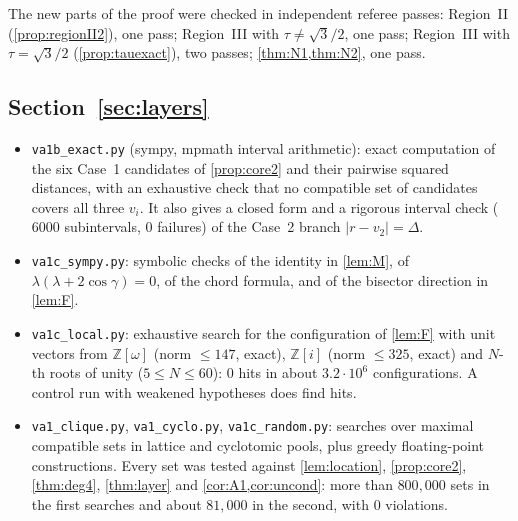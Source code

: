 \documentclass[11pt]{amsart}
\theoremstyle{definition}
\theoremstyle{remark}
\begin{document}
The new parts of the proof were checked in independent referee passes: Region~II (\cref{prop:regionII2}), one pass; Region~III with $\tau\ne\sqrt3/2$, one pass; Region~III with $\tau=\sqrt3/2$ (\cref{prop:tauexact}), two passes; \cref{thm:N1,thm:N2}, one pass.

\subsection*{\texorpdfstring{Section~\ref{sec:layers}}{Layer bound}}
\begin{itemize}[leftmargin=2em]
\item \texttt{va1b\_exact.py} (sympy, mpmath interval arithmetic): exact computation of the six Case~1 candidates of \cref{prop:core2} and their pairwise squared distances, with an exhaustive check that no compatible set of candidates covers all three $v_i$. It also gives a closed form and a rigorous interval check ($6000$ subintervals, $0$ failures) of the Case~2 branch $|r-v_2|=\Delta$.
\item \texttt{va1c\_sympy.py}: symbolic checks of the identity in \cref{lem:M}, of $\lambda(\lambda+2\cos\gamma)=0$, of the chord formula, and of the bisector direction in \cref{lem:F}.
\item \texttt{va1c\_local.py}: exhaustive search for the configuration of \cref{lem:F} with unit vectors from $\mathbb Z[\omega]$ (norm $\le147$, exact), $\mathbb Z[i]$ (norm $\le325$, exact) and $N$-th roots of unity ($5\le N\le60$): $0$ hits in about $3.2\cdot10^6$ configurations. A control run with weakened hypotheses does find hits.
\item \texttt{va1\_clique.py}, \texttt{va1\_cyclo.py}, \texttt{va1c\_random.py}: searches over maximal compatible sets in lattice and cyclotomic pools, plus greedy floating-point constructions. Every set was tested against \cref{lem:location}, \cref{prop:core2}, \cref{thm:deg4}, \cref{thm:layer} and \cref{cor:A1,cor:uncond}: more than $800{,}000$ sets in the first searches and about $81{,}000$ in the second, with $0$ violations.
\end{itemize}
\end{document}

